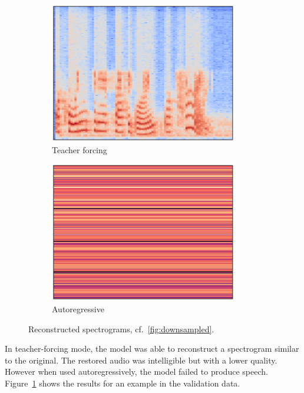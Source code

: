 \documentclass[11pt]{article}
\begin{document}
\begin{figure}
\begin{subfigure}{0.5\textwidth}
\centering
\includegraphics[width=0.9\textwidth]{image/forcing.pdf}
\caption*{Teacher forcing}
\end{subfigure}%
\begin{subfigure}{0.5\textwidth}
\centering
\includegraphics[width=0.9\textwidth]{image/autoreg.pdf}
\caption*{Autoregressive}
\end{subfigure}
\caption{\label{fig:recons}Reconstructed spectrograms, cf.~\ref{fig:downsampled}.}
\end{figure}

In teacher-forcing mode, the model was able to reconstruct a spectrogram similar to the original.
The restored audio was intelligible but with a lower quality.
However when used autoregressively, the model failed to produce speech.
Figure~\ref{fig:recons} shows the results for an example in the validation data.
\end{document}
